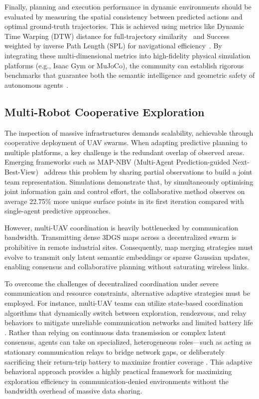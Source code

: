 \documentclass[conference]{IEEEtran}
\begin{document}
Finally, planning and execution performance in dynamic environments should be evaluated by measuring the spatial consistency between predicted actions and optimal ground-truth trajectories. This is achieved using metrics like Dynamic Time Warping (DTW) distance for full-trajectory similarity~\cite{astribot2025lumo} and Success weighted by inverse Path Length (SPL) for navigational efficiency~\cite{semantic_survey2025}. By integrating these multi-dimensional metrics into high-fidelity physical simulation platforms (e.g., Isaac Gym or MuJoCo), the community can establish rigorous benchmarks that guarantee both the semantic intelligence and geometric safety of autonomous agents~\cite{chen2024gennbv, zhang2024vlabench}.

\subsection{Multi-Robot Cooperative Exploration}
\label{subsec:disc_multirobot}

The inspection of massive infrastructures demands scalability, achievable through cooperative deployment of UAV swarms.
When adapting predictive planning to multiple platforms, a key challenge is the redundant overlap of observed areas.
Emerging frameworks such as MAP-NBV (Multi-Agent Prediction-guided Next-Best-View)~\cite{dhami2024mapnbv} address this problem by sharing partial observations to build a joint team representation.
Simulations demonstrate that, by simultaneously optimising joint information gain and control effort, the collaborative method observes on average 22.75\% more unique surface points in its first iteration compared with single-agent predictive approaches.

However, multi-UAV coordination is heavily bottlenecked by communication bandwidth. Transmitting dense 3DGS maps across a decentralized swarm is prohibitive in remote industrial sites. Consequently, map merging strategies must evolve to transmit only latent semantic embeddings or sparse Gaussian updates, enabling consensus and collaborative planning without saturating wireless links.

To overcome the challenges of decentralized coordination under severe communication and resource constraints, alternative adaptive strategies must be employed. For instance, multi-UAV teams can utilize state-based coordination algorithms that dynamically switch between exploration, rendezvous, and relay behaviors to mitigate unreliable communication networks and limited battery life \cite{7139494}. Rather than relying on continuous data transmission or complex latent consensus, agents can take on specialized, heterogeneous roles—such as acting as stationary communication relays to bridge network gaps, or deliberately sacrificing their return-trip battery to maximize frontier coverage \cite{7139494}. This adaptive behavioral approach provides a highly practical framework for maximizing exploration efficiency in communication-denied environments without the bandwidth overhead of massive data sharing.
\end{document}
